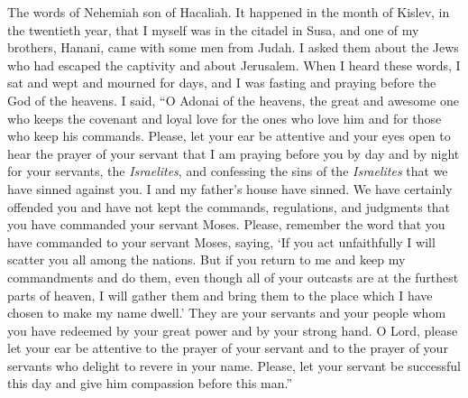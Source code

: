 
\begin{biblechapter} %
 The words of Nehemiah son of Hacaliah.
\verse It happened in the month of Kislev, in the twentieth year, that I myself was in the citadel in Susa,
\verse and one of my brothers, Hanani, came with some men from Judah. I asked them about the Jews who had escaped the captivity and about Jerusalem.
\verse When I heard these words, I sat and wept and mourned for days, and I was fasting and praying before the God of the heavens.
\verse I said, “O Adonai of the heavens, the great and awesome one who keeps the covenant and loyal love for the ones who love him and for those who keep his commands.
\verse Please, let your ear be attentive and your eyes open to hear the prayer of your servant that I am praying before you by day and by night for your servants, the \textit{Israelites}, and confessing the sins of the \textit{Israelites} that we have sinned against you. I and my father’s house have sinned.
\verse We have certainly offended you and have not kept the commands, regulations, and judgments that you have commanded your servant Moses.
\verse Please, remember the word that you have commanded to your servant Moses, saying, ‘If you act unfaithfully I will scatter you all among the nations.
\verse But if you return to me and keep my commandments and do them, even though all of your outcasts are at the furthest parts of heaven, I will gather them and bring them to the place which I have chosen to make my name dwell.’
\verse They are your servants and your people whom you have redeemed by your great power and by your strong hand.
\verse O Lord, please let your ear be attentive to the prayer of your servant and to the prayer of your servants who delight to revere in your name. Please, let your servant be successful this day and give him compassion before this man.”
\end{biblechapter}

